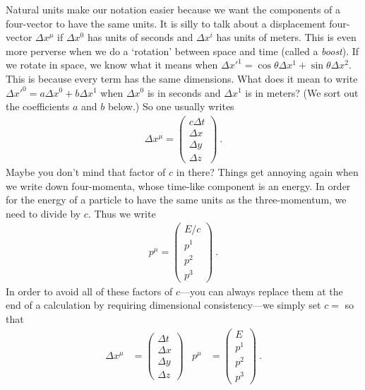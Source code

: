 \documentclass[12pt]{article}
\begin{document}
Natural units make our notation easier because we want the components of a four-vector to have the same units. It is silly to talk about a displacement four-vector $\Delta x^\mu$ if $\Delta x^0$ has units of seconds and $\Delta x^i$ has units of meters. This is even more perverse when we do a `rotation' between space and time (called a \emph{boost}). If we rotate in space, we know what it means when $\Delta x'^1 = \cos\theta \Delta x^1 + \sin\theta \Delta x^2$. This is because every term has the same dimensions. What does it mean to write $\Delta x'^0 = a \Delta x^0 + b \Delta x^1$ when $\Delta x^0$ is in seconds and $\Delta x^1$ is in meters? (We sort out the coefficients $a$ and $b$ below.) So one usually writes 
\begin{align}
    \Delta x^\mu = 
    \begin{pmatrix}
        c\Delta t \\ \Delta x \\ \Delta y \\ \Delta z
    \end{pmatrix} \ .
\end{align}
Maybe you don't mind that factor of $c$ in there? Things get annoying again when we write down four-momenta, whose time-like component is an energy. In order for the energy of a particle to have the same units as the three-momentum, we need to divide by $c$. Thus we write
\begin{align}
    p^\mu = 
    \begin{pmatrix}
        E/c \\
        p^1\\
        p^2\\
        p^3
    \end{pmatrix} \ .
\end{align}
In order to avoid all of these factors of $c$---you can always replace them at the end of a calculation by requiring dimensional consistency---we simply set $c=$ so that
\begin{align}
    \Delta x^\mu &= 
    \begin{pmatrix}
        \Delta t \\ \Delta x \\ \Delta y \\ \Delta z
    \end{pmatrix}
    &
    p^\mu &= 
    \begin{pmatrix}
        E \\
        p^1\\
        p^2\\
        p^3
    \end{pmatrix} \ .
\end{align}
\end{document}
